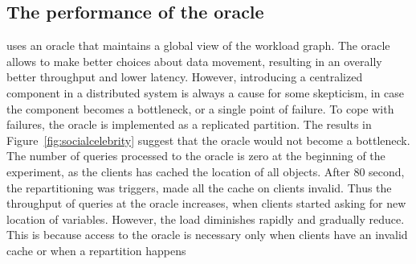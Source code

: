
\subsection{The performance of the oracle}

\dynastar  uses an oracle that maintains a global view of the workload graph. The oracle allows
\dynastar to make better choices about data movement, resulting in an overally
better throughput and lower latency. However, introducing a centralized
component in a distributed system is always a cause for some skepticism,
in case the component becomes a bottleneck, or a single point of failure. 
To cope with failures, the oracle is implemented as a replicated partition. 
The results in Figure~\ref{fig:socialcelebrity} suggest that the oracle would not become a bottleneck.
The number of queries processed to the oracle is zero at the 
beginning of the experiment, as the clients has cached the location of all objects.
After 80 second, the repartitioning was triggers, made all the cache on clients invalid.
Thus the throughput of queries at the oracle increases, when clients started asking for new location of variables.
However, the load diminishes rapidly and gradually reduce. This is because access to the oracle is necessary only
when clients have an invalid cache or when a repartition happens


